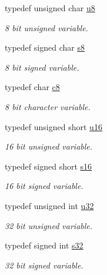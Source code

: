 \begin{CompactItemize}
\item 
typedef unsigned char \hyperlink{namespaceirr_646874f69af8ff87fc10201b0254a761}{u8}
\begin{CompactList}\small\item\em 8 bit unsigned variable. \item\end{CompactList}\item 
typedef signed char \hyperlink{namespaceirr_dc3ec66d7537550be0fea1c9eeadd63d}{s8}
\begin{CompactList}\small\item\em 8 bit signed variable. \item\end{CompactList}\item 
typedef char \hyperlink{namespaceirr_9395eaea339bcb546b319e9c96bf7410}{c8}
\begin{CompactList}\small\item\em 8 bit character variable. \item\end{CompactList}\item 
typedef unsigned short \hyperlink{namespaceirr_e9f8ec82692ad3b83c21f555bfa70bcc}{u16}
\begin{CompactList}\small\item\em 16 bit unsigned variable. \item\end{CompactList}\item 
typedef signed short \hyperlink{namespaceirr_43ace0af066371ac0862bac3f7314220}{s16}
\begin{CompactList}\small\item\em 16 bit signed variable. \item\end{CompactList}\item 
typedef unsigned int \hyperlink{namespaceirr_0416a53257075833e7002efd0a18e804}{u32}
\begin{CompactList}\small\item\em 32 bit unsigned variable. \item\end{CompactList}\item 
typedef signed int \hyperlink{namespaceirr_c66849b7a6ed16e30ebede579f9b47c6}{s32}
\begin{CompactList}\small\item\em 32 bit signed variable. \item\end{CompactList}\item 

\end{CompactItemize}
